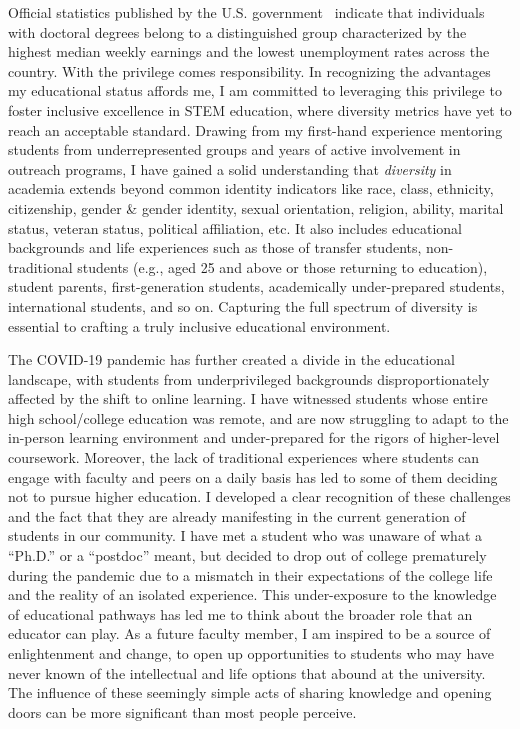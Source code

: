 Official statistics published by the U.S. government~\cite{EducationPaysBureau} indicate that individuals with doctoral degrees belong to a distinguished group characterized by the highest median weekly earnings and the lowest unemployment rates across the country. With the privilege comes responsibility. In recognizing the advantages my educational status affords me, I am committed to leveraging this privilege to foster inclusive excellence in STEM education, where diversity metrics have yet to reach an acceptable standard. Drawing from my first-hand experience mentoring students from underrepresented groups and years of active involvement in outreach programs, I have gained a solid understanding that \emph{diversity} in academia extends beyond common identity indicators like race, class, ethnicity, citizenship, gender \& gender identity, sexual orientation, religion, ability, marital status, veteran status, political affiliation, etc. It also includes educational backgrounds and life experiences such as those of transfer students, non-traditional students (e.g., aged 25 and above or those returning to education), student parents, first-generation students, academically under-prepared students, international students, and so on. Capturing the full spectrum of diversity is essential to crafting a truly inclusive educational environment.

The COVID-19 pandemic has further created a divide in the educational landscape, with students from underprivileged backgrounds disproportionately affected by the shift to online learning. I have witnessed students whose entire high school/college education was remote, and are now struggling to adapt to the in-person learning environment and under-prepared for the rigors of higher-level coursework. Moreover, the lack of traditional experiences where students can engage with faculty and peers on a daily basis has led to some of them deciding not to pursue higher education. I developed a clear recognition of these challenges and the fact that they are already manifesting in the current generation of students in our community. I have met a student who was unaware of what a ``Ph.D.'' or a ``postdoc'' meant, but decided to drop out of college prematurely during the pandemic due to a mismatch in their expectations of the college life and the reality of an isolated experience. This under-exposure to the knowledge of educational pathways has led me to think about the broader role that an educator can play. As a future faculty member, I am inspired to be a source of enlightenment and change, to open up opportunities to students who may have never known of the intellectual and life options that abound at the university. The influence of these seemingly simple acts of sharing knowledge and opening doors can be more significant than most people perceive.

